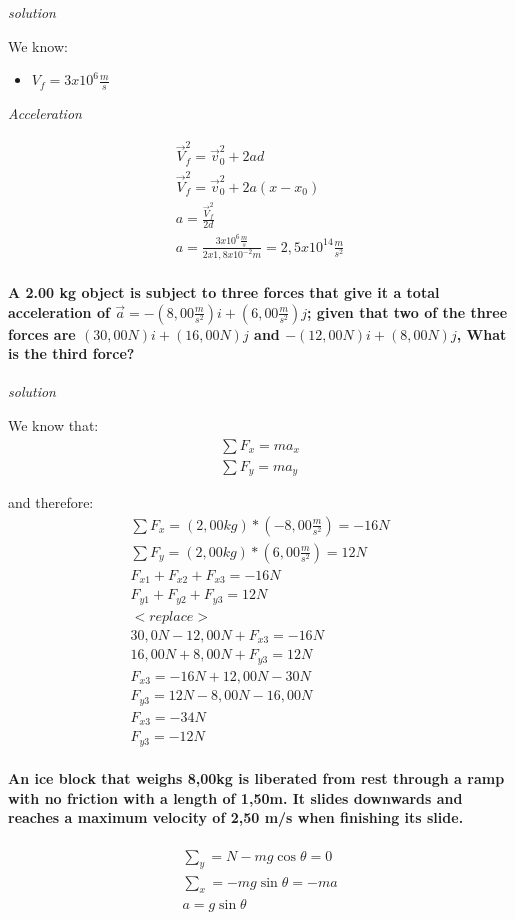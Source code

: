 \documentclass[11pt,fleqn]{book} %
\begin{document}
\textit{solution}

We know:
\begin{itemize}
    \item $ V_f = 3x10^6 \frac{m}{s} $
\end{itemize}

\textit{Acceleration}

\begin{gather}
    \vec{V}_f^2 = \vec{v}_0^2 + 2ad\\
    \vec{V}_f^2 = \vec{v}_0^2 + 2a(x-x_0) \\
    a = \frac{\vec{V}_f^2}{2d}\\
    a = \frac{3x10^6 \frac{m}{s}}{2 x 1,8x10^{-2}m} = 2,5x10^{14} \frac{m}{s^2}
\end{gather}

\paragraph{A 2.00 kg object is subject to three forces that give it a total
acceleration of $\vec{a} = -(8,00 \frac{m}{s^2})i + (6,00 \frac{m}{s^2})j$; given that two of the three forces are
$ (30,00N)i + (16,00N)j $ and $-(12,00N)i + (8,00N)j$, What is the third force?}

\textit{solution}

We know that:
\begin{gather}
    \sum F_x = ma_x\\
    \sum F_y = ma_y
\end{gather}

and therefore:
\begin{gather}
    \sum{F_x} = (2,00 kg)*(-8,00 \frac{m}{s^2}) = -16N \\
    \sum{F_y} = (2,00 kg)*(6,00 \frac{m}{s^2}) = 12N \\
    F_{x1} + F_{x2} + F_{x3} = -16N\\
    F_{y1} + F_{y2} + F_{y3} = 12N\\
    <replace>\\
    30,0N - 12,00N + F_{x3} = -16N\\
    16,00N + 8,00N + F_{y3} = 12N\\
    F_{x3} = -16N + 12,00N - 30N\\
    F_{y3} = 12N - 8,00N - 16,00N\\
    F_{x3} = -34N\\
    F_{y3} = -12N
\end{gather}

\paragraph*{An ice block that weighs 8,00kg is liberated from rest through a 
ramp with no friction with a length of 1,50m. It slides downwards and reaches a
maximum velocity of 2,50 m/s when finishing its slide.}
\begin{gather}
    \sum_{y} = N - mg \cos \theta = 0\\
    \sum_{x} = -mg \sin \theta = -ma\\
    a = g \sin \theta
\end{gather}
\end{document}
